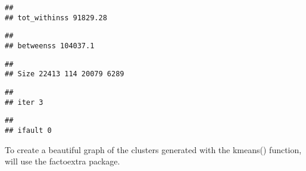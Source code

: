 \documentclass[
]{article}
\newenvironment{Shaded}{\begin{snugshade}}{\end{snugshade}}
\newcommand{\CharTok}[1]{\textcolor[rgb]{0.31,0.60,0.02}{#1}}
\newcommand{\KeywordTok}[1]{\textcolor[rgb]{0.13,0.29,0.53}{\textbf{#1}}}
\newcommand{\NormalTok}[1]{#1}
\newcommand{\OperatorTok}[1]{\textcolor[rgb]{0.81,0.36,0.00}{\textbf{#1}}}
\newcommand{\StringTok}[1]{\textcolor[rgb]{0.31,0.60,0.02}{#1}}
\begin{document}
\begin{verbatim}
## 
## tot_withinss 91829.28
\end{verbatim}

\begin{Shaded}
\end{Shaded}

\begin{verbatim}
## 
## betweenss 104037.1
\end{verbatim}

\begin{Shaded}
\end{Shaded}

\begin{verbatim}
## 
## Size 22413 114 20079 6289
\end{verbatim}

\begin{Shaded}
\end{Shaded}

\begin{verbatim}
## 
## iter 3
\end{verbatim}

\begin{Shaded}
\end{Shaded}

\begin{verbatim}
## 
## ifault 0
\end{verbatim}

To create a beautiful graph of the clusters generated with the kmeans()
function, will use the factoextra package.
\end{document}
